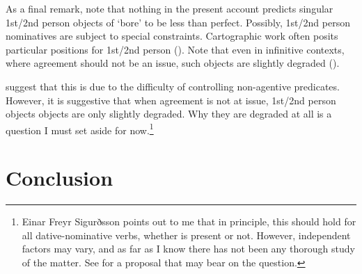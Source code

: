 \documentclass[output=paper]{langscibook}
\def\exattr#1{\hfill{} #1}
\begin{document}
As a final remark, note that nothing in the present account  predicts  singular 1st/2nd person objects of  `bore' to be less than perfect. Possibly, 1st/2nd person nominatives  are subject to special constraints. Cartographic work often  posits particular positions  for 1st/2nd person (\citealt{Savescu:2009al}). Note that even in infinitive contexts, where agreement should not be an issue, such objects are slightly degraded (\citealt[271]{SigurTHsson:2008dm}).


\z
\citet[271]{SigurTHsson:2008dm} suggest that this is due to the difficulty of controlling non-agentive predicates. However, it is suggestive that when agreement is not at issue, 1st/2nd person objects objects are only slightly degraded. Why they are degraded at all is a question I must set aside for now.\footnote{Einar Freyr Sigurðsson points out to me that in principle, this should hold for all dative-nominative verbs, whether  is present or not. However, independent factors may vary, and as far as I know there has not been any thorough study of the matter. See \citet{SigEPP} for a proposal that may bear on the question.} 


\section{Conclusion}
\end{document}
